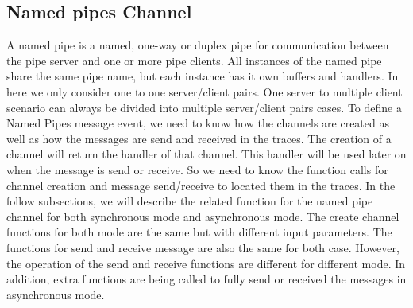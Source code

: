 \documentclass[paper=a4, fontsize=11pt]{scrartcl}
\numberwithin{equation}{section}		%
\numberwithin{figure}{section}			%
\numberwithin{table}{section}				%
\begin{document}
\subsection{Named pipes Channel}
A named pipe is a named, one-way or duplex pipe for communication between the pipe server and one or more pipe clients. All instances of the named pipe share the same pipe name, but each instance has it own buffers and handlers. In here we only consider one to one server/client pairs. One server to multiple client scenario can always be divided into multiple server/client pairs cases. To define a Named Pipes message event, we need to know how the channels are created as well as how the messages are send and received in the traces. The creation of a channel will return the handler of that channel. This handler will be used later on when the message is send or receive. So we need to know the function calls for channel creation and message send/receive to located them in the traces. In the follow subsections, we will describe the related function for the named pipe channel for both synchronous mode and asynchronous mode. The create channel functions for both mode are the same but with different input parameters. The functions for send and receive message are also the same for both case. However, the operation of the send and receive functions are different for different mode. In addition, extra functions are being called to fully send or received the messages in asynchronous mode.
\end{document}
